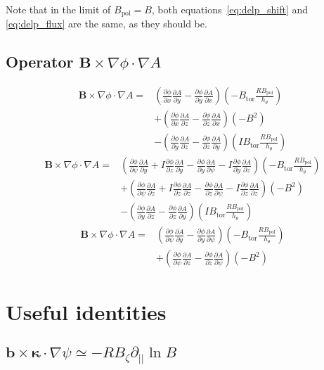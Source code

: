 \documentclass[12pt]{article}
\def\L{\left}
\def\R{\right}
\newcommand{\deriv}[2]{\ensuremath{\frac{\partial #1}{\partial #2}}}
\newcommand{\hthe}{\ensuremath{h_\theta}}
\newcommand{\Bp}{\ensuremath{B_{\text{pol}}}}
\newcommand{\Bt}{\ensuremath{B_{\text{tor}}}}
\newcommand{\ve}[1]{\ensuremath{\boldsymbol{#1}}}
\newcommand{\Bvec}{\ve{B}}
\newcommand{\rbp}{\ensuremath{R\Bp}}
\begin{document}
Note that in the limit of $\Bp = B$, both equations~\ref{eq:delp_shift} and
\ref{eq:delp_flux} are the same, as they should be.



\subsection{Operator \texorpdfstring{$\Bvec\times\nabla\phi\cdot\nabla A$}
%
{B x Nabla Phi Dot Nabla A}}
%
\begin{align*}
\Bvec\times\nabla\phi\cdot\nabla A =& \L(\deriv{\phi}{x}\deriv{A}{y} -
    \deriv{\phi}{y}\deriv{A}{x}\R)\L(-\Bt\frac{\rbp}{\hthe}\R) \\ &+
    \L(\deriv{\phi}{x}\deriv{A}{z} - \deriv{\phi}{z}\deriv{A}{x}\R)\L(-B^2\R)
    \\ &- \L(\deriv{\phi}{y}\deriv{A}{z} -
    \deriv{\phi}{z}\deriv{A}{y}\R)\L(I\Bt\frac{\rbp}{\hthe}\R)
\end{align*}
%
\begin{align*}
\Bvec\times\nabla\phi\cdot\nabla A =& \L(\deriv{\phi}{\psi}\deriv{A}{y} + I
    \deriv{\phi}{z}\deriv{A}{y} - \deriv{\phi}{y}\deriv{A}{\psi} -
    I\deriv{\phi}{y}\deriv{A}{z}\R)\L(-\Bt\frac{\rbp}{\hthe}\R) \\ &+
    \L(\deriv{\phi}{\psi}\deriv{A}{z} + I\deriv{\phi}{z}\deriv{A}{z} -
    \deriv{\phi}{z}\deriv{A}{\psi} - I\deriv{\phi}{z}\deriv{A}{z}\R)\L(-B^2\R)
    \\ &- \L(\deriv{\phi}{y}\deriv{A}{z} -
    \deriv{\phi}{z}\deriv{A}{y}\R)\L(I\Bt\frac{\rbp}{\hthe}\R)
\end{align*}
%
\begin{align*}
\Bvec\times\nabla\phi\cdot\nabla A =& \L(\deriv{\phi}{\psi}\deriv{A}{y} -
    \deriv{\phi}{y}\deriv{A}{\psi}\R)\L(-\Bt\frac{\rbp}{\hthe}\R) \nonumber \\
    &+ \L(\deriv{\phi}{\psi}\deriv{A}{z} - \deriv{\phi}{z}\deriv{A}{\psi}
    \R)\L(-B^2\R)
\end{align*}

\section{Useful identities}

\subsection{$\mathbf{b}\times\mathbf{\kappa}\cdot\nabla\psi \simeq -RB_\zeta\partial_{||}\ln B$}
\end{document}
